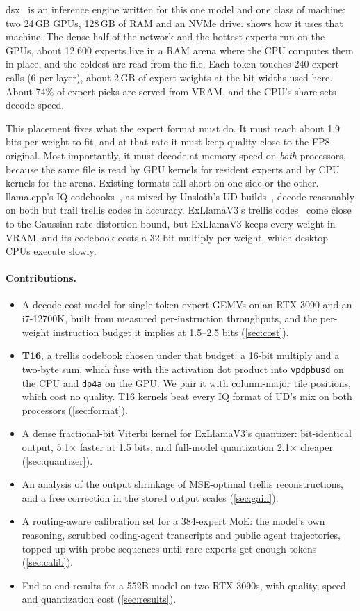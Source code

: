 \documentclass[10pt]{article}
\begin{document}
dsx~\cite{dsx} is an inference engine written for this one model and one class of machine: two 24\,GB GPUs, 128\,GB of
RAM and an NVMe drive.  shows how it uses that machine. The dense half of the network and the hottest
experts run on the GPUs, about 12{,}600 experts live in a RAM arena where the CPU computes them in place, and the
coldest are read from the file. Each token touches 240 expert calls (6 per layer), about 2\,GB of expert weights at the
bit widths used here. About 74\% of expert picks are served from VRAM, and the CPU's share sets decode speed.

This placement fixes what the expert format must do. It must reach about 1.9 bits per weight to fit, and at that rate
it must keep quality close to the FP8 original. Most importantly, it must decode at memory speed on \emph{both}
processors, because the same file is read by GPU kernels for resident experts and by CPU kernels for the arena. Existing
formats fall short on one side or the other. llama.cpp's IQ codebooks~\cite{llamacpp}, as mixed by Unsloth's UD
builds~\cite{unsloth}, decode reasonably on both but trail trellis codes in accuracy. ExLlamaV3's trellis
codes~\cite{exllamav3,qtip} come close to the Gaussian rate-distortion bound, but ExLlamaV3 keeps every weight in VRAM,
and its codebook costs a 32-bit multiply per weight, which desktop CPUs execute slowly.

\paragraph{Contributions.}
\begin{itemize}\setlength{\itemsep}{1pt}
\item A decode-cost model for single-token expert GEMVs on an RTX 3090 and an i7-12700K, built from measured
per-instruction throughputs, and the per-weight instruction budget it implies at 1.5--2.5 bits (\cref{sec:cost}).
\item \textbf{T16}, a trellis codebook chosen under that budget: a 16-bit multiply and a two-byte sum, which fuse with
the activation dot product into \texttt{vpdpbusd} on the CPU and \texttt{dp4a} on the GPU. We pair it with
column-major tile positions, which cost no quality. T16 kernels beat every IQ format of UD's mix on both processors
(\cref{sec:format}).
\item A dense fractional-bit Viterbi kernel for ExLlamaV3's quantizer: bit-identical output, 5.1$\times$ faster at
1.5 bits, and full-model quantization 2.1$\times$ cheaper (\cref{sec:quantizer}).
\item An analysis of the output shrinkage of MSE-optimal trellis reconstructions, and a free correction in the stored
output scales (\cref{sec:gain}).
\item A routing-aware calibration set for a 384-expert MoE: the model's own reasoning, scrubbed coding-agent
transcripts and public agent trajectories, topped up with probe sequences until rare experts get enough tokens
(\cref{sec:calib}).
\item End-to-end results for a 552B model on two RTX 3090s, with quality, speed and quantization cost
(\cref{sec:results}).
\end{itemize}
\end{document}
